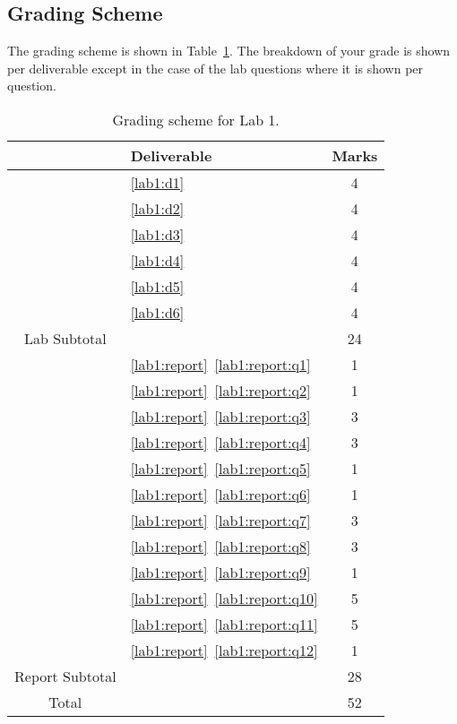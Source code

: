 \subsection{Grading Scheme}
The grading scheme is shown in Table~\ref{tab:lab1:grading}. The breakdown of
your grade is shown per deliverable except in the case of the lab
questions where it is shown per question.
%
\begin{table}
\centering
\begin{tabular}{c|l|c}
        & Deliverable           & Marks  \\ \hline
        & \ref{lab1:d1}         & 4       \\ \hline
        & \ref{lab1:d2}         & 4       \\ \hline
        & \ref{lab1:d3}         & 4       \\ \hline
        & \ref{lab1:d4}         & 4       \\ \hline
        & \ref{lab1:d5}         & 4       \\ \hline
        & \ref{lab1:d6}         & 4       \\ \hhline{=|=|=}
Lab Subtotal&                       & 24      \\ \hhline{=|=|=}
        & \ref{lab1:report}~\ref{lab1:report:q1}  & 1       \\ \hline
        & \ref{lab1:report}~\ref{lab1:report:q2}  & 1       \\ \hline
        & \ref{lab1:report}~\ref{lab1:report:q3}  & 3       \\ \hline
        & \ref{lab1:report}~\ref{lab1:report:q4}  & 3       \\ \hline
        & \ref{lab1:report}~\ref{lab1:report:q5}  & 1       \\ \hline
        & \ref{lab1:report}~\ref{lab1:report:q6}  & 1       \\ \hline
        & \ref{lab1:report}~\ref{lab1:report:q7}  & 3       \\ \hline
        & \ref{lab1:report}~\ref{lab1:report:q8}  & 3       \\ \hline
        & \ref{lab1:report}~\ref{lab1:report:q9}  & 1       \\ \hline
        & \ref{lab1:report}~\ref{lab1:report:q10} & 5       \\ \hline
        & \ref{lab1:report}~\ref{lab1:report:q11} & 5       \\ \hline
        & \ref{lab1:report}~\ref{lab1:report:q12} & 1       \\ \hhline{=|=|=}
Report Subtotal&  & 28 \\ \hhline{=|=|=}
  Total &                       & 52
\end{tabular}
\caption[Grading Scheme for Lab 1]{Grading scheme for Lab 1.}
\label{tab:lab1:grading}
\end{table}
%
